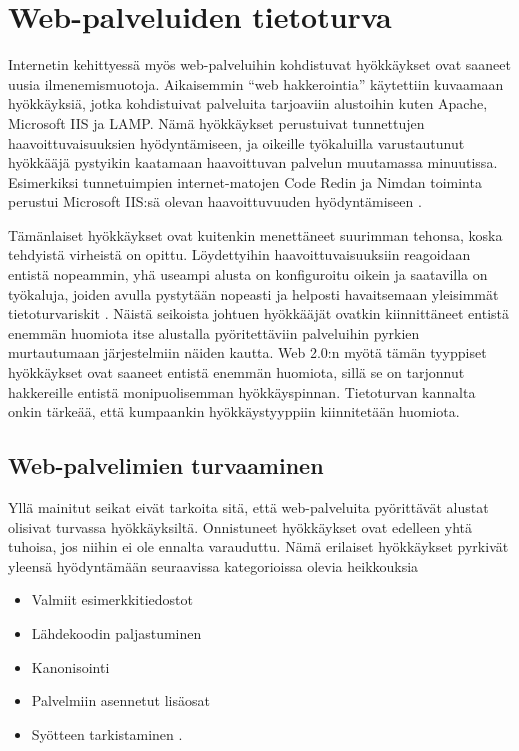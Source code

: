 \section{Web-palveluiden tietoturva}

Internetin kehittyessä myös web-palveluihin kohdistuvat hyökkäykset ovat saaneet
uusia ilmenemismuotoja. Aikaisemmin ``web hakkerointia'' käytettiin kuvaamaan
hyökkäyksiä, jotka kohdistuivat palveluita tarjoaviin alustoihin kuten Apache, 
Microsoft IIS ja LAMP. Nämä hyökkäykset perustuivat tunnettujen haavoittuvaisuuksien
hyödyntämiseen, ja oikeille työkaluilla varustautunut hyökkääjä pystyikin kaatamaan haavoittuvan
palvelun muutamassa minuutissa. Esimerkiksi tunnetuimpien internet-matojen Code Redin ja Nimdan toiminta
perustui Microsoft IIS:sä olevan haavoittuvuuden hyödyntämiseen \cite{Hacking}. 

Tämänlaiset hyökkäykset ovat kuitenkin
menettäneet suurimman tehonsa, koska tehdyistä virheistä on opittu. Löydettyihin haavoittuvaisuuksiin
reagoidaan entistä nopeammin, yhä useampi alusta on konfiguroitu oikein ja saatavilla on työkaluja, joiden
avulla pystytään nopeasti ja helposti havaitsemaan yleisimmät tietoturvariskit \cite{Hacking}. Näistä seikoista johtuen
hyökkääjät ovatkin kiinnittäneet entistä enemmän huomiota itse alustalla pyöritettäviin palveluihin pyrkien 
murtautumaan järjestelmiin näiden kautta. Web 2.0:n myötä tämän tyyppiset hyökkäykset ovat saaneet entistä
enemmän huomiota, sillä se on tarjonnut hakkereille entistä monipuolisemman hyökkäyspinnan. Tietoturvan 
kannalta onkin tärkeää, että kumpaankin hyökkäystyyppiin kiinnitetään huomiota.

\subsection{Web-palvelimien turvaaminen}

Yllä mainitut seikat eivät tarkoita sitä, että web-palveluita pyörittävät alustat olisivat
turvassa hyökkäyksiltä. Onnistuneet hyökkäykset ovat edelleen yhtä tuhoisa, jos niihin ei ole ennalta 
varauduttu. Nämä erilaiset hyökkäykset pyrkivät yleensä hyödyntämään seuraavissa kategorioissa olevia heikkouksia

\begin{itemize}
\item Valmiit esimerkkitiedostot
\item Lähdekoodin paljastuminen
\item Kanonisointi
\item Palvelmiin asennetut lisäosat
\item Syötteen tarkistaminen \cite{Hacking}.
\end{itemize}


